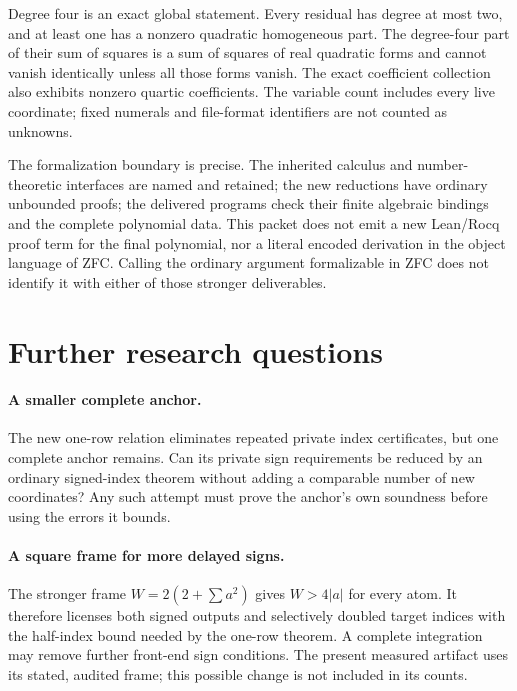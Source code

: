 \documentclass[11pt]{article}
\theoremstyle{remark}\newtheorem{remark}[theorem]{Remark}
\begin{document}


Degree four is an exact global statement. Every residual has degree at most two, and at least one has a nonzero quadratic homogeneous part. The degree-four part of their sum of squares is a sum of squares of real quadratic forms and cannot vanish identically unless all those forms vanish. The exact coefficient collection also exhibits nonzero quartic coefficients. The variable count includes every live coordinate; fixed numerals and file-format identifiers are not counted as unknowns.

The formalization boundary is precise. The inherited calculus and number-theoretic interfaces are named and retained; the new reductions have ordinary unbounded proofs; the delivered programs check their finite algebraic bindings and the complete polynomial data. This packet does not emit a new Lean/Rocq proof term for the final polynomial, nor a literal encoded derivation in the object language of ZFC. Calling the ordinary argument formalizable in ZFC does not identify it with either of those stronger deliverables.

\section{Further research questions}

\paragraph{A smaller complete anchor.}
The new one-row relation eliminates repeated private index certificates, but one complete anchor remains. Can its private sign requirements be reduced by an ordinary signed-index theorem without adding a comparable number of new coordinates? Any such attempt must prove the anchor's own soundness before using the errors it bounds.

\paragraph{A square frame for more delayed signs.}
The stronger frame $W=2(2+\sum a^2)$ gives $W>4|a|$ for every atom. It therefore licenses both signed outputs and selectively doubled target indices with the half-index bound needed by the one-row theorem. A complete integration may remove further front-end sign conditions. The present measured artifact uses its stated, audited frame; this possible change is not included in its counts.
\end{document}
